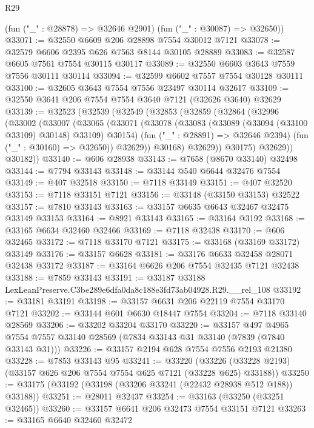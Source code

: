\begin{lexlean}{R29}
\begin{coremodule}
      (fun ("_" : @28878) => @32646 @2901)
      (fun ("_" : @30087) => @32650))
@33071 := @32550 @6609 @206 @28898 @7554 @30012 @7121
@33078 := @32579 @6606 @2395 @626 @7563 @8144 @30105 @28889
@33083 := @32587 @6605 @7561 @7554 @30115 @30117
@33089 := @32550 @6603 @3643 @7559 @7556 @30111 @30114
@33094 := @32599 @6602 @7557 @7554 @30128 @30111
@33100 := @32605 @3643 @7554 @7556 @23497 @30114 @32617
@33109 := @32550 @3641 @206 @7554 @7554 @3640 @7121 (@32626 @3640) @32629
@33139 := @32523
    (@32539
      (@32549
        (@32853
          (@32859
            (@32864
              (@32996
                (@33002
                  (@33007
                    (@33065
                      (@33071
                        (@33078
                          (@33083 (@33089 (@33094 (@33100 @33109) @30148) @33109) @30154)
                          (fun ("_" : @28891) => @32646 @2394)
                          (fun ("_" : @30160) => @32650))
                        @32629))
                    @30168)
                  @32629))
              @30175)
            @32629))
        @30182))
@33140 := @606 @28938
@33143 := @7658 (@8670 @33140) @32498
@33144 := @7794 @33143
@33148 := @33144 @540 @6644 @32476 @7554
@33149 := @407 @32518
@33150 := @7118 @33149
@33151 := @407 @32520
@33153 := @7118 @33151 @7121
@33156 := @33148 (@33150 @33153) @32522
@33157 := @7810 @33143
@33163 := @33157 @6635 @6643 @32467 @32475 @33149 @33153
@33164 := @8921 @33143
@33165 := @33164 @3192
@33168 := @33165 @6634 @32460 @32466
@33169 := @7118 @32438
@33170 := @606 @32465
@33172 := @7118 @33170 @7121
@33175 := @33168 (@33169 @33172) @33149
@33176 := @33157 @6628
@33181 := @33176 @6633 @32458 @28071 @32438 @33172
@33187 := @33164 @6626 @206 @7554 @32435 @7121 @32438
@33188 := @7859 @33143
@33191 := @33187 @33188 LexLeanPreserve.C3be289e6dfa0da8c188e3fd73ab04928.R29.__rel_108
@33192 := @33181 @33191
@33198 := @33157 @6631 @206 @22119 @7554 @33170 @7121
@33202 := @33144 @601 @6630 @18447 @7554
@33204 := @7118 @33140 @28569
@33206 := @33202 @33204 @33170
@33220 := @33157
    @497
    @4965
    @7554
    @7557
    @33140
    @28569
    (@7834 @33143 @31 @33140 (@7839 (@7840 @33143 @31)))
@33226 := @33157 @2194 @628 @7554 @7556 @2193 @21380
@33228 := @7853 @33143 @95
@33241 := @33220
    (@33226 (@33228 @2193) (@33157 @626 @206 @7554 @7554 @625 @7121 (@33228 @625) @33188))
@33250 := @33175 (@33192 (@33198 (@33206 @33241 (@22432 @28938 @512 @188)) @33188))
@33251 := @28011 @32437
@33254 := @33163 (@33250 (@33251 @32465))
@33260 := @33157 @6641 @206 @32473 @7554 @33151 @7121
@33263 := @33165 @6640 @32460 @32472

\end{coremodule}
\end{lexlean}
